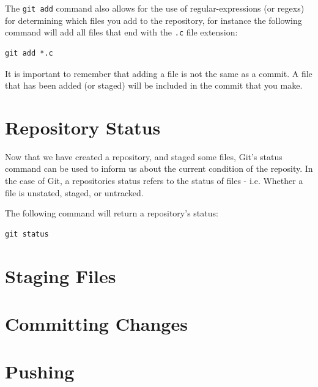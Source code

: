 \documentclass[11pt, a4paper, titlepage]{article}
\begin{document}
The {\tt git add} command also allows for the use of regular-expressions (or
regexs) for determining which files you add to the repository, for instance the
following command will add all files that end with the {\tt .c} file
extension:

\begin{lstlisting}[label=lst_add_regex,
caption=Adding all files ending with .c file etension.]
 git add *.c
\end{lstlisting}
It is important to remember that adding a file is not the same as a commit.
A file that has been added (or staged) will be included in the commit that you
make.


\section{Repository Status}
Now that we have created a repository, and staged some files, Git's status
command can be used to inform us about the current condition of the reposity.
In the case of Git, a repositories status refers to the status of files - i.e.
Whether a file is unstated, staged, or untracked.

The following command will return a repository's status:

\begin{lstlisting}[label=lst_status,
caption=Initialisin a new Git repository]
 git status
\end{lstlisting}



\section{Staging Files}



\section{Committing Changes}



\section{Pushing}
\end{document}
